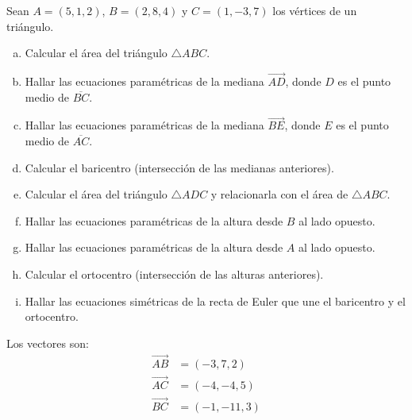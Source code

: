 \begin{prob} Sean $A=(5,1,2)$, $B=(2,8,4)$ y $C=(1,-3,7)$ los vértices de un triángulo.

\begin{enumerate}[a)]
\item Calcular el área del triángulo $\triangle ABC$.
\item Hallar las ecuaciones paramétricas de la mediana $\overrightarrow{AD}$, donde $D$ es el punto medio de $\overline{BC}$.
\item Hallar las ecuaciones paramétricas de la mediana $\overrightarrow{BE}$, donde $E$ es el punto medio de $\overline{AC}$.
\item Calcular el baricentro (intersección de las medianas anteriores).
\item Calcular el área del triángulo $\triangle ADC$ y relacionarla con el área de $\triangle ABC$.
\item Hallar las ecuaciones paramétricas de la altura desde $B$ al lado opuesto.
\item Hallar las ecuaciones paramétricas de la altura desde $A$ al lado opuesto.
\item Calcular el ortocentro (intersección de las alturas anteriores).
\item Hallar las ecuaciones simétricas de la recta de Euler que une el baricentro y el ortocentro.
\end{enumerate}

\begin{myproof}
\begin{multicols}{2}
\begin{figure}[H]
\centering
{}
\end{figure}

Los vectores son:
\begin{align*}
\overrightarrow{AB} &= (-3,7,2) \\
\overrightarrow{AC} &= (-4,-4,5) \\
\overrightarrow{BC} &= (-1,-11,3)
\end{align*}
\end{multicols}


\end{myproof}
\end{prob}
